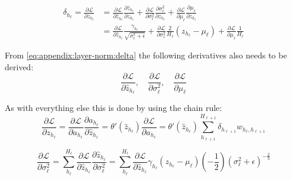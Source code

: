 \begin{equation}
\begin{aligned}
\delta_{h_\ell} = \frac{\partial \mathcal{L}}{\partial z_{h_\ell}} &= \frac{\partial \mathcal{L}}{\partial \hat{z}_{h_\ell}} \frac{\partial \hat{z}_{h_\ell}}{\partial z_{h_\ell}} + \frac{\partial \mathcal{L}}{\partial \sigma_{\ell}^2} \frac{\partial \sigma_{\ell}^2}{\partial z_{h_\ell}} + \frac{\partial \mathcal{L}}{\partial \mu_{\ell}} \frac{\partial \mu_{\ell}}{\partial z_{h_\ell}} \\
&= \frac{\partial \mathcal{L}}{\partial \hat{z}_{h_\ell}} \frac{\gamma_{h_\ell}}{\sqrt{\sigma_{\ell}^2 + \epsilon}} + \frac{\partial \mathcal{L}}{\partial \sigma_{\ell}^2} \frac{2}{H_\ell}\left(z_{h_\ell} - \mu_{\ell}\right) + \frac{\partial \mathcal{L}}{\partial \mu_{\ell}} \frac{1}{H_\ell}
\end{aligned}
\label{eq:appendix:layer-norm:delta}
\end{equation}

From \eqref{eq:appendix:layer-norm:delta} the following derivatives also needs to be derived:
\begin{equation}
\frac{\partial \mathcal{L}}{\partial \hat{z}_{h_\ell}}, \quad \frac{\partial \mathcal{L}}{\partial \sigma_{\ell}^2}, \quad \frac{\partial \mathcal{L}}{\partial \mu_{\ell}}
\end{equation}

As with everything else this is done by using the chain rule:
\begin{equation}
\frac{\partial \mathcal{L}}{\partial \hat{z}_{h_\ell}} = \frac{\partial \mathcal{L}}{\partial a_{h_\ell}} \frac{\partial a_{h_\ell}}{\partial \hat{z}_{h_\ell}} = \theta'(\hat{z}_{h_\ell}) \frac{\partial \mathcal{L}}{\partial a_{h_\ell}} = \theta'(\hat{z}_{h_\ell}) \sum_{h_{\ell+1}}^{H_{\ell+1}} \delta_{h_{\ell+1}} w_{h_\ell, h_{\ell+1}}
\end{equation}

\begin{equation}
\frac{\partial \mathcal{L}}{\partial \sigma^2_\ell} = \sum_{h_\ell}^{H_\ell} \frac{\partial \mathcal{L}}{\partial \hat{z}_{h_\ell}} \frac{\partial \hat{z}_{h_\ell}}{\partial \sigma_\ell^2} = \sum_{h_\ell}^{H_\ell} \frac{\partial \mathcal{L}}{\partial \hat{z}_{h_\ell}} \gamma_{h_\ell} (z_{h_\ell} - \mu_\ell) \left(- \frac{1}{2}\right) \left(\sigma_\ell^2 + \epsilon\right)^{-\frac{2}{3}}
\end{equation}


